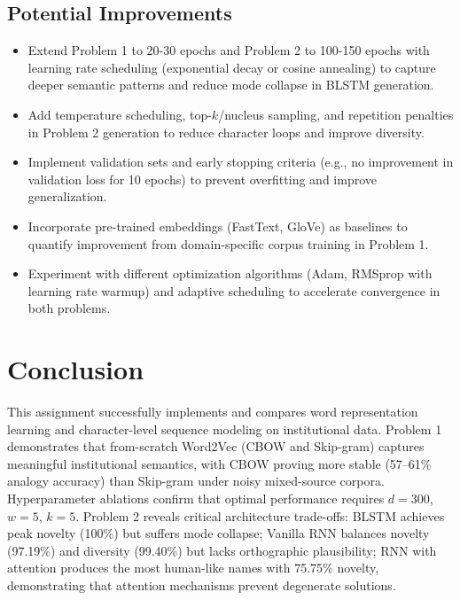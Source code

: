 \documentclass[11pt,a4paper]{article}
\begin{document}
\subsection{Potential Improvements}
\begin{itemize}[leftmargin=1.5em]
    \item Extend Problem 1 to 20-30 epochs and Problem 2 to 100-150 epochs with learning rate scheduling (exponential decay or cosine annealing) to capture deeper semantic patterns and reduce mode collapse in BLSTM generation.

    \item Add temperature scheduling, top-$k$/nucleus sampling, and repetition penalties in Problem 2 generation to reduce character loops and improve diversity.
    \item Implement validation sets and early stopping criteria (e.g., no improvement in validation loss for 10 epochs) to prevent overfitting and improve generalization.
    \item Incorporate pre-trained embeddings (FastText, GloVe) as baselines to quantify improvement from domain-specific corpus training in Problem 1.
   
    \item Experiment with different optimization algorithms (Adam, RMSprop with learning rate warmup) and adaptive scheduling to accelerate convergence in both problems.
\end{itemize}

\section{Conclusion}

This assignment successfully implements and compares word representation learning and character-level sequence modeling on institutional data. Problem 1 demonstrates that from-scratch Word2Vec (CBOW and Skip-gram) captures meaningful institutional semantics, with CBOW proving more stable (57--61\% analogy accuracy) than Skip-gram under noisy mixed-source corpora. Hyperparameter ablations confirm that optimal performance requires $d=300$, $w=5$, $k=5$. Problem 2 reveals critical architecture trade-offs: BLSTM achieves peak novelty (100\%) but suffers mode collapse; Vanilla RNN balances novelty (97.19\%) and diversity (99.40\%) but lacks orthographic plausibility; RNN with attention produces the most human-like names with 75.75\% novelty, demonstrating that attention mechanisms prevent degenerate solutions.
\end{document}
